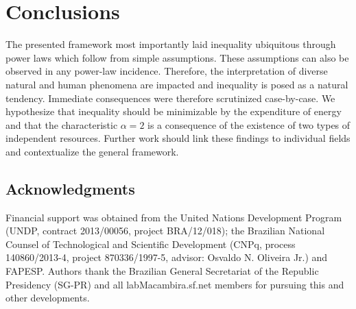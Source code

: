 \documentclass[a4paper, 11pt]{article} %
\begin{document}
\section{Conclusions}
The presented framework 
most importantly laid inequality ubiquitous
through power laws which follow from simple assumptions.
These assumptions can also be observed in any power-law incidence.
Therefore, the interpretation of diverse natural and human phenomena 
are impacted and inequality is posed as a natural tendency.
Immediate consequences were therefore scrutinized case-by-case.
We hypothesize that
inequality should be minimizable by the expenditure of energy
and that the characteristic $\alpha=2$ is a consequence of
the existence of two types of independent resources.
Further work should link these findings to individual fields
and contextualize the general framework.

\subsection*{Acknowledgments}
Financial support was obtained from 
the United Nations Development Program 
(UNDP, contract 2013/00056, project BRA/12/018);
the Brazilian National Counsel of Technological 
and Scientific Development (CNPq, process 140860/2013-4, project 870336/1997-5,
advisor: Osvaldo N. Oliveira Jr.) and FAPESP.
Authors thank
the Brazilian 
General Secretariat of the Republic Presidency (SG-PR) and 
all
labMacambira.sf.net members for pursuing this and other developments.

%
%
\end{document}

